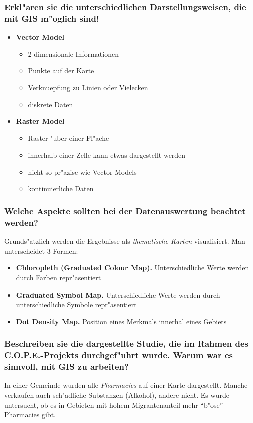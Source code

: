 \subsubsection{Erkl"aren sie die unterschiedlichen Darstellungsweisen, die mit GIS m"oglich sind!}
\begin{itemize}
        \item \textbf{Vector Model}
                \begin{itemize}
                        \item 2-dimensionale Informationen 
                        \item Punkte auf der Karte
                        \item Verknuepfung zu Linien oder Vielecken
                        \item diskrete Daten
                \end{itemize}
        \item \textbf{Raster Model}
                \begin{itemize}
                        \item Raster "uber einer Fl"ache 
                        \item innerhalb einer Zelle kann etwas dargestellt werden
                        \item nicht so pr"azise wie Vector Models
                        \item kontinuierliche Daten
                \end{itemize}
\end{itemize}

\subsubsection{Welche Aspekte sollten bei der Datenauswertung beachtet werden?}
Grunds"atzlich werden die Ergebnisse als \emph{thematische Karten} visualisiert. Man unterscheidet 3 Formen:
\begin{itemize}
        \item \textbf{Chloropleth (Graduated Colour Map).} Unterschiedliche Werte werden durch Farben repr"asentiert
        \item \textbf{Graduated Symbol Map.} Unterschiedliche Werte werden durch unterschiedliche Symbole repr"asentiert
        \item \textbf{Dot Density Map.} Position eines Merkmals innerhal eines Gebiets 
\end{itemize}

\subsubsection{Beschreiben sie die dargestellte Studie, die im Rahmen des C.O.P.E.-Projekts durchgef"uhrt wurde. Warum war es sinnvoll, mit GIS zu arbeiten?}
In einer Gemeinde wurden alle \emph{Pharmacies} auf einer Karte dargestellt. Manche verkaufen auch sch"adliche Substanzen (Alkohol), andere nicht. Es wurde untersucht, ob es in Gebieten mit hohem Migrantenanteil mehr ``b"ose'' Pharmacies gibt. 

